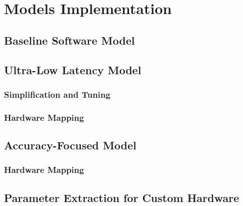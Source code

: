 \chapter{Models Implementation}


\section{Baseline Software Model}


\section{Ultra-Low Latency Model}

\subsection{Simplification and Tuning}

\subsection{Hardware Mapping}


\section{Accuracy-Focused Model}

\subsection{Hardware Mapping}


\section{Parameter Extraction for Custom Hardware}
